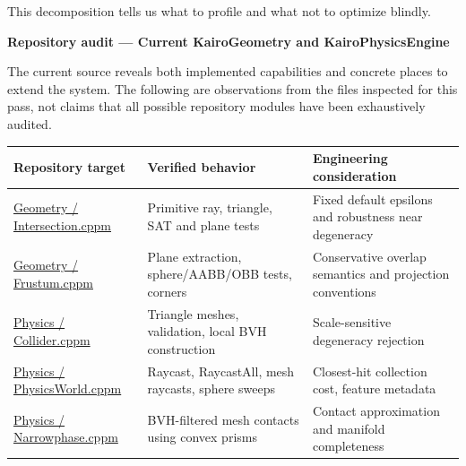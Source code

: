 This decomposition tells us what to profile and what not to optimize blindly.

\textbf{Repository audit --- Current KairoGeometry and KairoPhysicsEngine}

The current source reveals both implemented capabilities and concrete places to extend the system. The following are observations from the files inspected for this pass, not claims that all possible repository modules have been exhaustively audited.

{\def\LTcaptype{none} %
\begin{longtable}[]{@{}
  >{\raggedright\arraybackslash}p{}
  >{\raggedright\arraybackslash}p{}
  >{\raggedright\arraybackslash}p{}@{}}
\toprule\noalign{}
\begin{minipage}[b]{\linewidth}\raggedright
Repository target
\end{minipage} & \begin{minipage}[b]{\linewidth}\raggedright
Verified behavior
\end{minipage} & \begin{minipage}[b]{\linewidth}\raggedright
Engineering consideration
\end{minipage} \\
\midrule\noalign{}
\endhead
\bottomrule\noalign{}
\endlastfoot
\href{https://github.com/swayam8624/KairoGeometry/blob/master/Intersection.cppm?utm_source=chatgpt.com}{Geometry / Intersection.cppm} & Primitive ray, triangle, SAT and plane tests & Fixed default epsilons and robustness near degeneracy \\
\href{https://github.com/swayam8624/KairoGeometry/blob/master/Frustum.cppm?utm_source=chatgpt.com}{Geometry / Frustum.cppm} & Plane extraction, sphere/AABB/OBB tests, corners & Conservative overlap semantics and projection conventions \\
\href{https://github.com/swayam8624/KairoPhysicsEngine/blob/main/Collider.cppm?utm_source=chatgpt.com}{Physics / Collider.cppm} & Triangle meshes, validation, local BVH construction & Scale-sensitive degeneracy rejection \\
\href{https://github.com/swayam8624/KairoPhysicsEngine/blob/main/PhysicsWorld.cppm?utm_source=chatgpt.com}{Physics / PhysicsWorld.cppm} & Raycast, RaycastAll, mesh raycasts, sphere sweeps & Closest-hit collection cost, feature metadata \\
\href{https://github.com/swayam8624/KairoPhysicsEngine/blob/main/Narrowphase.cppm?utm_source=chatgpt.com}{Physics / Narrowphase.cppm} & BVH-filtered mesh contacts using convex prisms & Contact approximation and manifold completeness \\

\end{longtable}}
